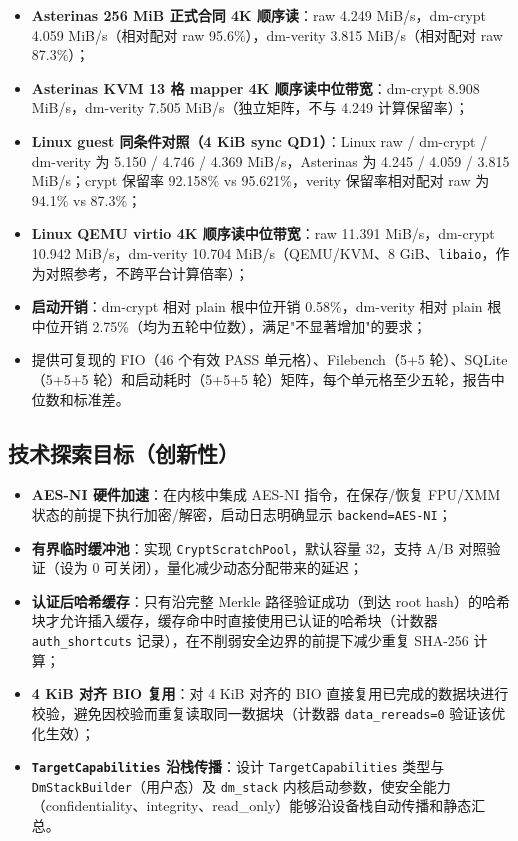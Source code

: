 \begin{itemize}
    \item \textbf{Asterinas 256 MiB 正式合同 4K 顺序读}：raw 4.249 MiB/s，dm-crypt 4.059 MiB/s（相对配对 raw 95.6\%），dm-verity 3.815 MiB/s（相对配对 raw 87.3\%）；
    \item \textbf{Asterinas KVM 13 格 mapper 4K 顺序读中位带宽}：dm-crypt 8.908 MiB/s，dm-verity 7.505 MiB/s（独立矩阵，不与 4.249 计算保留率）；
    \item \textbf{Linux guest 同条件对照（4 KiB sync QD1）}：Linux raw / dm-crypt / dm-verity 为 5.150 / 4.746 / 4.369 MiB/s，Asterinas 为 4.245 / 4.059 / 3.815 MiB/s；crypt 保留率 92.158\% vs 95.621\%，verity 保留率相对配对 raw 为 94.1\% vs 87.3\%；
    \item \textbf{Linux QEMU virtio 4K 顺序读中位带宽}：raw 11.391 MiB/s，dm-crypt 10.942 MiB/s，dm-verity 10.704 MiB/s（QEMU/KVM、8 GiB、\texttt{libaio}，作为对照参考，不跨平台计算倍率）；
    \item \textbf{启动开销}：dm-crypt 相对 plain 根中位开销 0.58\%，dm-verity 相对 plain 根中位开销 2.75\%（均为五轮中位数），满足"不显著增加"的要求；
    \item 提供可复现的 FIO（46 个有效 PASS 单元格）、Filebench（5+5 轮）、SQLite（5+5+5 轮）和启动耗时（5+5+5 轮）矩阵，每个单元格至少五轮，报告中位数和标准差。
\end{itemize}

\subsection{技术探索目标（创新性）}

\begin{itemize}
    \item \textbf{AES-NI 硬件加速}：在内核中集成 AES-NI 指令，在保存/恢复 FPU/XMM 状态的前提下执行加密/解密，启动日志明确显示 \texttt{backend=AES-NI}；
    \item \textbf{有界临时缓冲池}：实现 \texttt{CryptScratchPool}，默认容量 32，支持 A/B 对照验证（设为 0 可关闭），量化减少动态分配带来的延迟；
    \item \textbf{认证后哈希缓存}：只有沿完整 Merkle 路径验证成功（到达 root hash）的哈希块才允许插入缓存，缓存命中时直接使用已认证的哈希块（计数器 \texttt{auth\_shortcuts} 记录），在不削弱安全边界的前提下减少重复 SHA-256 计算；
    \item \textbf{4 KiB 对齐 BIO 复用}：对 4 KiB 对齐的 BIO 直接复用已完成的数据块进行校验，避免因校验而重复读取同一数据块（计数器 \texttt{data\_rereads=0} 验证该优化生效）；
    \item \textbf{\texttt{TargetCapabilities} 沿栈传播}：设计 \texttt{TargetCapabilities} 类型与 \texttt{DmStackBuilder}（用户态）及 \texttt{dm\_stack} 内核启动参数，使安全能力（confidentiality、integrity、read\_only）能够沿设备栈自动传播和静态汇总。
\end{itemize}

